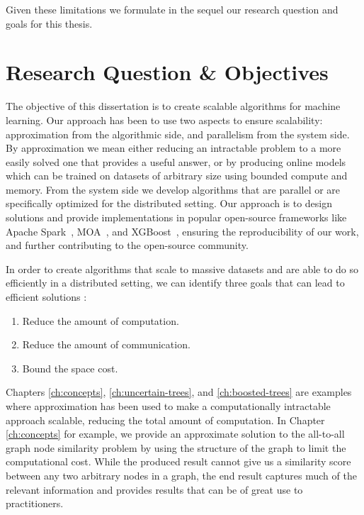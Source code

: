 Given these limitations we formulate in the sequel our research question and goals for
this thesis.

\section{Research Question \& Objectives}
\label{sec:intro-question-objectives}

The objective of this dissertation is to create scalable algorithms for machine
learning. Our approach has been to use two aspects to ensure scalability:
approximation from the algorithmic side, and parallelism from the system
side. By approximation we mean either reducing an intractable problem
to a more easily solved one that provides a useful answer, or by producing
online models which can be trained on datasets of arbitrary size using bounded
compute and memory. From the system side we develop algorithms that are parallel
or are specifically optimized for the distributed setting.
Our approach is to design solutions and provide implementations
in popular open-source frameworks like Apache Spark~\cite{spark},
MOA~\cite{samoa}, and XGBoost~\cite{xgboost}, ensuring the reproducibility
of our work, and further contributing to the open-source community.

In order to create algorithms that scale to massive datasets and are able to
do so efficiently in a distributed setting, we can identify three goals that can
lead to efficient solutions \cite{vasia-thesis}:

\begin{enumerate}
	\item Reduce the amount of computation.
	\item Reduce the amount of communication.
	\item Bound the space cost.
\end{enumerate}

Chapters \ref{ch:concepts}, \ref{ch:uncertain-trees}, and \ref{ch:boosted-trees}
are examples where approximation has been used to make a computationally intractable
approach scalable, reducing the total amount of computation.
In Chapter \ref{ch:concepts} for example, we provide an approximate solution
to the all-to-all graph node similarity problem by using the structure of the
graph to limit the computational cost. While the produced result cannot give
us a similarity score between any two arbitrary nodes in a graph, the end result captures
much of the relevant information and provides results that can be of great use
to practitioners.

